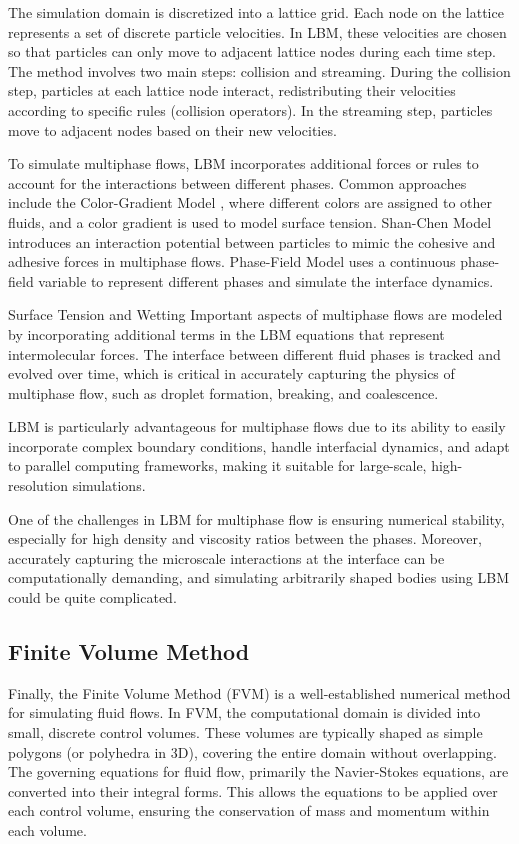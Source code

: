The simulation domain is discretized into a lattice grid. Each node on the lattice represents a set of discrete particle velocities. In LBM, these velocities are chosen so that particles can only move to adjacent lattice nodes during each time step. The method involves two main steps: collision and streaming. During the collision step, particles at each lattice node interact, redistributing their velocities according to specific rules (collision operators). In the streaming step, particles move to adjacent nodes based on their new velocities.

To simulate multiphase flows, LBM incorporates additional forces or rules to account for the interactions between different phases. Common approaches include the Color-Gradient Model \cite{ba2013color}, where different colors are assigned to other fluids, and a color gradient is used to model surface tension. Shan-Chen Model \cite{huang2011forcing} introduces an interaction potential between particles to mimic the cohesive and adhesive forces in multiphase flows. Phase-Field Model \cite{takada2013phase}uses a continuous phase-field variable to represent different phases and simulate the interface dynamics.

Surface Tension and Wetting Important aspects of multiphase flows are modeled by incorporating additional terms in the LBM equations that represent intermolecular forces. The interface between different fluid phases is tracked and evolved over time, which is critical in accurately capturing the physics of multiphase flow, such as droplet formation, breaking, and coalescence.

LBM is particularly advantageous for multiphase flows due to its ability to easily incorporate complex boundary conditions, handle interfacial dynamics, and adapt to parallel computing frameworks, making it suitable for large-scale, high-resolution simulations.

One of the challenges in LBM for multiphase flow is ensuring numerical stability, especially for high density and viscosity ratios between the phases. Moreover, accurately capturing the microscale interactions at the interface can be computationally demanding, and simulating arbitrarily shaped bodies using LBM could be quite complicated.

\subsection{Finite Volume Method}

Finally, the Finite Volume Method (\ac{FVM}) is a well-established numerical method for simulating fluid flows. In FVM, the computational domain is divided into small, discrete control volumes. These volumes are typically shaped as simple polygons (or polyhedra in 3D), covering the entire domain without overlapping. The governing equations for fluid flow, primarily the Navier-Stokes equations, are converted into their integral forms. This allows the equations to be applied over each control volume, ensuring the conservation of mass and momentum within each volume.

